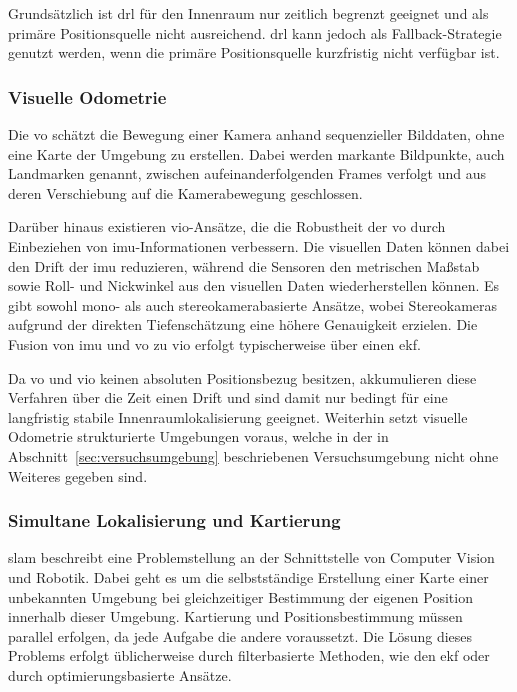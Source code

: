 Grundsätzlich ist \gls{drl} für den Innenraum nur zeitlich begrenzt geeignet und als primäre Positionsquelle nicht ausreichend.
\gls{drl} kann jedoch als Fallback-Strategie genutzt werden, wenn die primäre Positionsquelle kurzfristig nicht verfügbar ist.~\cite{9172736}

\subsubsection*{Visuelle Odometrie}
Die \gls{vo} schätzt die Bewegung einer Kamera anhand sequenzieller Bilddaten, ohne eine Karte der Umgebung zu erstellen.
Dabei werden markante Bildpunkte, auch Landmarken genannt, zwischen aufeinanderfolgenden Frames verfolgt und aus deren Verschiebung auf die Kamerabewegung geschlossen.~\cite{Jarraya2025}

Darüber hinaus existieren \gls{vio}-Ansätze, die die Robustheit der \gls{vo} durch Einbeziehen von \gls{imu}-Informationen verbessern.
Die visuellen Daten können dabei den Drift der \gls{imu} reduzieren, während die Sensoren den metrischen Maßstab sowie Roll- und Nickwinkel aus den visuellen 
Daten wiederherstellen können.
Es gibt sowohl mono- als auch stereokamerabasierte Ansätze, wobei Stereokameras aufgrund der direkten Tiefenschätzung eine höhere Genauigkeit erzielen.
Die Fusion von \gls{imu} und \gls{vo} zu \gls{vio} erfolgt typischerweise über einen \gls{ekf}.~\cite{9836067}

Da \gls{vo} und \gls{vio} keinen absoluten Positionsbezug besitzen, akkumulieren diese Verfahren über die Zeit einen Drift und sind damit nur bedingt für eine langfristig stabile Innenraumlokalisierung geeignet.
Weiterhin setzt visuelle Odometrie strukturierte Umgebungen voraus, welche in der in Abschnitt~\ref{sec:versuchsumgebung} beschriebenen Versuchsumgebung nicht ohne Weiteres gegeben sind.~\cite{Jarraya2025}



\subsubsection*{Simultane Lokalisierung und Kartierung}
\label{sec:slam}
\gls{slam} beschreibt eine Problemstellung an der Schnittstelle von Computer Vision und Robotik.
Dabei geht es um die selbstständige Erstellung einer Karte einer unbekannten Umgebung bei gleichzeitiger Bestimmung der eigenen Position 
innerhalb dieser Umgebung.
Kartierung und Positionsbestimmung müssen parallel erfolgen, da jede Aufgabe die andere voraussetzt.
Die Lösung dieses Problems erfolgt üblicherweise durch filterbasierte Methoden, wie den \gls{ekf} 
oder durch optimierungsbasierte Ansätze.~\cite{10169695}

